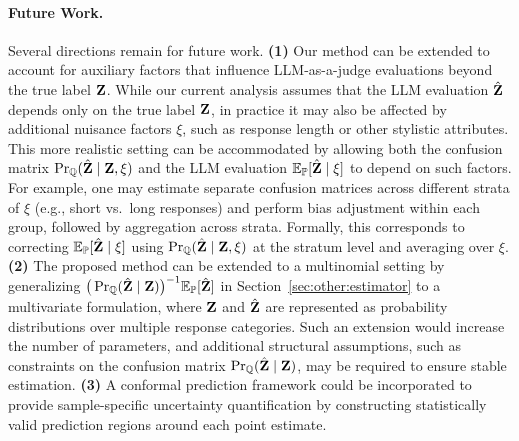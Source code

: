 \label{sec:future_work}

\paragraph{Future Work.}
Several directions remain for future work.
\textbf{(1)} Our method can be extended to account for auxiliary factors that influence LLM-as-a-judge evaluations beyond the true label ${\mathbf{Z}}$.
While our current analysis assumes that the LLM evaluation $\hat{{\mathbf{Z}}}$ depends only on the true label ${\mathbf{Z}}$,
in practice it may also be affected by additional nuisance factors $\xi$, such as response length or other stylistic attributes.
This more realistic setting can be accommodated by allowing both the confusion matrix
$\mathop{\rm Pr}\nolimits_{{\mathbb{Q}}}(\hat{{\mathbf{Z}}} \mid {\mathbf{Z}},\xi)$ and the LLM evaluation $\displaystyle \mathbb{E}_{{\mathbb{P}}}[\hat{{\mathbf{Z}}} \mid \xi]$ to depend on such factors.
For example, one may estimate separate confusion matrices across different strata of $\xi$
(e.g., short vs.\ long responses) and perform bias adjustment within each group,
followed by aggregation across strata.
Formally, this corresponds to correcting $\displaystyle \mathbb{E}_{{\mathbb{P}}}[\hat{{\mathbf{Z}}} \mid \xi]$
using $\mathop{\rm Pr}\nolimits_{{\mathbb{Q}}}(\hat{{\mathbf{Z}}} \mid {\mathbf{Z}},\xi)$ at the stratum level and averaging over $\xi$.
\textbf{(2)} The proposed method can be extended to a multinomial setting by generalizing $\big( \mathop{\rm Pr}\nolimits_{{\mathbb{Q}}}(\hat{{\mathbf{Z}}} \mid {\mathbf{Z}}) \big)^{-1} \displaystyle \mathbb{E}_{{\mathbb{P}}}[\hat{{\mathbf{Z}}}]$ in Section~\ref{sec:other:estimator} to a multivariate formulation, where ${\mathbf{Z}}$ and $\hat{{\mathbf{Z}}}$ are represented as probability distributions over multiple response categories. Such an extension would increase the number of parameters, and additional structural assumptions, such as constraints on the confusion matrix $\mathop{\rm Pr}\nolimits_{{\mathbb{Q}}}(\hat{{\mathbf{Z}}} \mid {\mathbf{Z}})$, may be required to ensure stable estimation.
\textbf{(3)} A conformal prediction framework could be incorporated to provide sample-specific uncertainty quantification by constructing statistically valid prediction regions around each point estimate.
